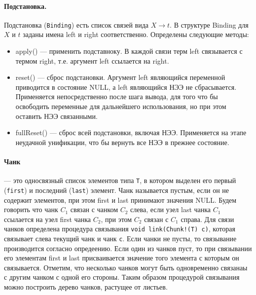 \paragraph{Подстановка.} Подстановка (\texttt{Binding}) есть список связей вида $X \rightarrow t$. В структуре Binding для $X$ и $t$ заданы имена left и right соответственно. Определены следующие методы:
\begin{itemize}
\item{apply()} --- применить подставноку. В каждой связи терм left связывается с термом right, т.е. аргумент left ссылается на right.
\item{reset()} --- сброс подстановки. Аргумент left являющийся переменной приводится в состояние NULL, а left являющийся НЭЭ не сбрасывается. Применяется непосредственно после шага вывода, для того что бы освободить переменные для дальнейшего использования, но при этом оставить НЭЭ связанными.
\item{fullReset()} --- сброс всей подстановки, включая НЭЭ. Применяется на этапе неудачной унификации, что бы вернуть все НЭЭ в прежнее состояние.
\end{itemize}

\paragraph{Чанк} --- это односвязный список элементов типа {\tt T}, в котором выделен его первый ({\tt first}) и последний ({\tt last}) элемент.  Чанк называется пустым, если он не содержит элементов, при этом first и last принимают значения NULL. Будем говорить что чанк $C_1$ связан с чанком $C_2$ слева, если узел last чанка $C_1$ ссылается на узел first чанка $C_2$, при этом $C_2$ связан с $C_1$ справа. Для связи чанков определена процедура связывания {\tt void link(Chunk!(T) c)}, которая связывает слева текущий чанк и чанк {\tt c}. Если чанки не пусты, то связывание производится согласно опредеению. Если один из чанков пуст, то при связывании его элементам first и last присваивается значение того элемента с которым он связывается. Отметим, что несколько чанков могут быть одновременно связанаы с другим чанком с одной его стороны. Таким образом процедурой связывания можно построить дерево чанков, растущее от листьев.

